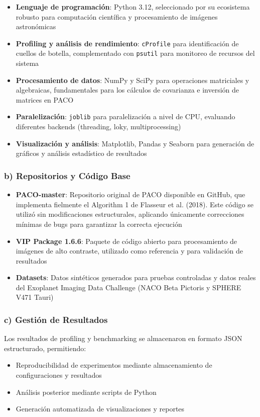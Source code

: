 \begin{itemize}
    \item \textbf{Lenguaje de programación}: Python 3.12, seleccionado por su ecosistema robusto para computación científica y procesamiento de imágenes astronómicas
    \item \textbf{Profiling y análisis de rendimiento}: \texttt{cProfile} para identificación de cuellos de botella, complementado con \texttt{psutil} para monitoreo de recursos del sistema
    \item \textbf{Procesamiento de datos}: NumPy y SciPy para operaciones matriciales y algebraicas, fundamentales para los cálculos de covarianza e inversión de matrices en PACO
    \item \textbf{Paralelización}: \texttt{joblib} para paralelización a nivel de CPU, evaluando diferentes backends (threading, loky, multiprocessing)
    \item \textbf{Visualización y análisis}: Matplotlib, Pandas y Seaborn para generación de gráficos y análisis estadístico de resultados
\end{itemize}

\subsubsection{b) Repositorios y Código Base}

\begin{itemize}
    \item \textbf{PACO-master}: Repositorio original de PACO disponible en GitHub, que implementa fielmente el Algorithm 1 de Flasseur et al. (2018). Este código se utilizó sin modificaciones estructurales, aplicando únicamente correcciones mínimas de bugs para garantizar la correcta ejecución
    \item \textbf{VIP Package 1.6.6}: Paquete de código abierto para procesamiento de imágenes de alto contraste, utilizado como referencia y para validación de resultados
    \item \textbf{Datasets}: Datos sintéticos generados para pruebas controladas y datos reales del Exoplanet Imaging Data Challenge (NACO Beta Pictoris y SPHERE V471 Tauri)
\end{itemize}

\subsubsection{c) Gestión de Resultados}

Los resultados de profiling y benchmarking se almacenaron en formato JSON estructurado, permitiendo:
\begin{itemize}
    \item Reproducibilidad de experimentos mediante almacenamiento de configuraciones y resultados
    \item Análisis posterior mediante scripts de Python
    \item Generación automatizada de visualizaciones y reportes
\end{itemize}

